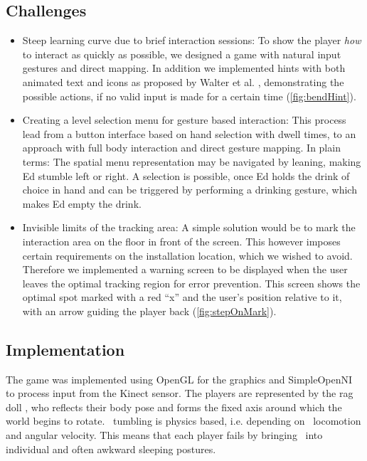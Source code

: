 \documentclass{chi-ext}
\begin{document}
\subsection{Challenges}
\begin{itemize}
	\item Steep learning curve due to brief interaction sessions: To show the player \textit{how} to interact as quickly as possible, we designed a game with natural input gestures and direct mapping. In addition we implemented hints with both animated text and icons as proposed by Walter et al. \cite{walter2013strikeapose}, demonstrating the possible actions, if no valid input is made for a certain time (\autoref{fig:bendHint}).
\item Creating a level selection menu for gesture based interaction: This process lead from a button interface based on hand selection with dwell times, to an approach with full body interaction and direct gesture mapping. In plain terms: The spatial menu representation may be navigated by leaning, making Ed stumble left or right. A selection is possible, once Ed holds the drink of choice in hand and can be triggered by performing a drinking gesture, which makes Ed empty the drink.
\item Invisible limits of the tracking area: A simple solution would be to mark the interaction area on the floor in front of the screen. This however imposes certain requirements on the installation location, which we wished to avoid. Therefore we implemented a warning screen to be displayed when the user leaves the optimal tracking region for error prevention. This screen shows the optimal spot marked with a red "`x"' and the user's position relative to it, with an arrow guiding the player back (\autoref{fig:stepOnMark}).
\end{itemize}
\subsection{Implementation}
The game was implemented using OpenGL for the graphics and SimpleOpenNI to process input from the Kinect sensor. The players are represented by the rag doll \ed, who reflects their body pose and forms the fixed axis around which the world begins to rotate. \eds\ tumbling is physics based, i.e. depending on \eds\ locomotion and angular velocity. This means that each player fails by bringing \ed\ into individual and often awkward sleeping postures.

\end{document}
